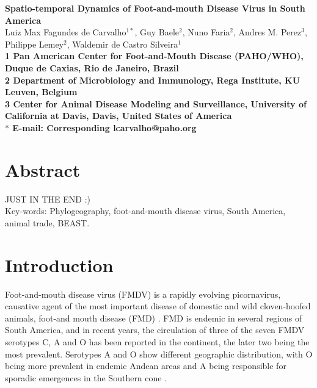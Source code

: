 \documentclass[10pt]{article}
\date{}
\begin{document}
\begin{flushleft}
{\Large
\textbf{Spatio-temporal Dynamics of Foot-and-mouth Disease Virus in South America}
}
\\
Luiz Max Fagundes de Carvalho$^{1\ast}$,
Guy Baele$^{2}$,
Nuno Faria$^{2}$,
Andres M. Perez$^{3}$,
Philippe Lemey$^{2}$,
Waldemir de Castro Silveira$^{1}$
\\
\bf{1} Pan American Center for Foot-and-Mouth Disease (PAHO/WHO), Duque de Caxias, Rio de Janeiro, Brazil
\\
\bf{2} Department of Microbiology and Immunology, Rega Institute, KU Leuven, Belgium
\\
\bf{3} Center for Animal Disease Modeling and Surveillance, University of California at Davis, Davis, United States of America
\\
$\ast$ E-mail: Corresponding lcarvalho@paho.org
\end{flushleft}

\section*{Abstract}

JUST IN THE END :)\\


Key-words: Phylogeography, foot-and-mouth disease virus, South America, animal trade, BEAST.

\section*{Introduction}

Foot-and-mouth disease virus (FMDV) is a rapidly evolving picornavirus, causative agent of the most important disease of domestic and wild cloven-hoofed animals, foot-and mouth disease (FMD) \cite{review}. FMD is endemic in several regions of South America, and 	in recent years, the circulation of three of the seven FMDV serotypes C, A and O has been reported in the continent, the later two being the most prevalent. Serotypes A and O show different  geographic distribution, with O being more prevalent in endemic Andean areas \cite{andean} and A being responsible for sporadic emergences in the Southern cone \cite{Perez2001,Malirat2012}.
\end{document}
